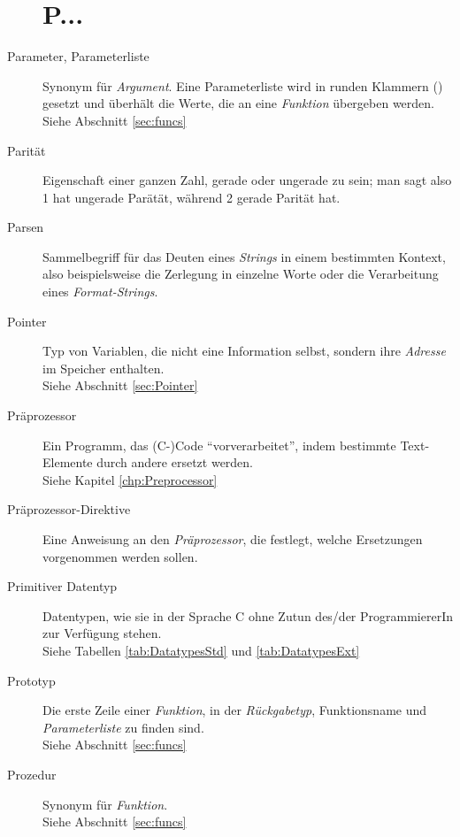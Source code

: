 \begin{appendices}
\begin{description}
\section*{P...}
\item[Parameter, Parameterliste] Synonym für \emph{Argument}. Eine Parameterliste wird in runden
	Klammern () gesetzt und überhält die Werte, die an eine \emph{Funktion} übergeben werden.\\
	Siehe Abschnitt \ref{sec:funcs}
\item[Parität] Eigenschaft einer ganzen Zahl, gerade oder ungerade zu sein; man sagt also 1 hat ungerade
	Parätät, während 2 gerade Parität hat.
\item[Parsen] Sammelbegriff für das Deuten eines \emph{Strings} in einem bestimmten Kontext, also
	beispielsweise die Zerlegung in einzelne Worte oder die Verarbeitung eines \emph{Format-Strings}.
\item[Pointer] Typ von Variablen, die nicht eine Information selbst, sondern ihre \emph{Adresse} im
	Speicher enthalten.\\
	Siehe Abschnitt \ref{sec:Pointer}
\item[Präprozessor] Ein Programm, das (C-)Code \enquote{vorverarbeitet}, indem bestimmte Text-Elemente
	durch andere ersetzt werden.\\
	Siehe Kapitel \ref{chp:Preprocessor}
\item[Präprozessor-Direktive] Eine Anweisung an den \emph{Präprozessor}, die \eg festlegt, welche
	Ersetzungen vorgenommen werden sollen.
\item[Primitiver Datentyp] Datentypen, wie sie in der Sprache C ohne Zutun des/der ProgrammiererIn zur
	Verfügung stehen.\\
	Siehe Tabellen \ref{tab:DatatypesStd} und \ref{tab:DatatypesExt}
\item[Prototyp] Die erste Zeile einer \emph{Funktion}, in der \emph{Rückgabetyp}, Funktionsname und
	\emph{Parameterliste} zu finden sind.\\
	Siehe Abschnitt \ref{sec:funcs}
\item[Prozedur] Synonym für \emph{Funktion}.\\
	Siehe Abschnitt \ref{sec:funcs}


\end{description}
\end{appendices}
